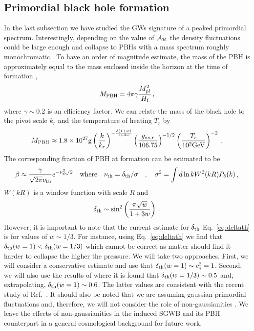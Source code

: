 \documentclass[aps,10pt,prd,groupedaddress,nofootinbib,notitlepage,eqsecnum,preprintnumbers]{revtex4-1}
\begin{document}
\subsection{Primordial black hole formation}

In the last subsection we have studied the GWs signature of a peaked primordial spectrum. Interestingly, depending on the value of ${\cal A}_{\cal R}$ the density fluctuations could be large enough and collapse to PBHs with a mass spectrum roughly monochromatic \cite{Carr:2009jm,Sasaki:2018dmp}. To have an order of magnitude estimate, the mass of the PBH is approximately equal to the mass enclosed inside the horizon at the time of formation \cite{Sasaki:2018dmp}, 
\begin{align}
M_{\rm PBH}=4\pi\gamma\frac{M_{pl}^2}{H_{\rm f}}\,,
\end{align}
where $\gamma\sim0.2$ is an efficiency factor. We can relate the mass of the black hole to the pivot scale $k_r$ and the temperature of heating $T_r$ by \cite{Alabidi:2013wtp}
\begin{align}
M_{\rm PBH}\approx 1.8\times 10^{27}{\rm g}\left(\frac{k}{k_r}\right)^{-\frac{3(1+w)}{1+3w}}\left(\frac{g_{*s,r}}{106.75}\right)^{-1/2}\left(\frac{T_r}{10^2{\rm GeV}}\right)^{-2}\,.
\end{align}
The corresponding fraction of PBH at formation can be estimated to be \cite{Sasaki:2018dmp}
\begin{align}
\beta\approx\frac{\gamma}{\sqrt{2\pi}\nu_{\rm th}}e^{-\nu_{\rm th}^2/2}
\quad {\rm where}\quad
\nu_{\rm th}=\delta_{\rm th}/\sigma\quad,\quad \sigma^2=\int d\ln k W^2(kR)P_{\delta}(k)\,,
\end{align}
$W(kR)$ is a window function with scale $R$ and \cite{Harada:2013epa,Sasaki:2018dmp,Escriva:2019phb}
\begin{align}\label{eq:deltath}
\delta_{\rm th}\sim \sin^2\left(\frac{\pi\sqrt{w}}{1+3w}\right)\,.
\end{align}
However, it is important to note that the current estimate for $\delta_{\rm th}$ Eq.~\eqref{eq:deltath} is for values of $w\sim1/3$. For instance, using Eq.~\eqref{eq:deltath} we find that $\delta_{\rm th}(w=1)<\delta_{\rm th}(w=1/3)$ which cannot be correct as matter should find it harder to collapse the higher the pressure. We will take two approaches. First, we will consider a conservative estimate and use that $\delta_{\rm th}(w=1)\sim c_s^2=1$. Second, we will also use the results of \cite{Musco:2012au} where it is found that $\delta_{\rm th}(w=1/3)\sim 0.5$ and, extrapolating, $\delta_{\rm th}(w=1)\sim 0.6$. The latter values are consistent with the recent study of Ref.~\cite{Escriva:2019nsa}. It should also be noted that we are assuming gaussian primordial fluctuations and, therefore, we will not consider the role of non-gaussianities \cite{Germani:2018jgr,Atal:2018neu,Young:2019yug,Atal:2019cdz}. We leave the effects of non-gaussianities in the induced SGWB and its PBH counterpart in a general cosmological background for future work.
\end{document}
